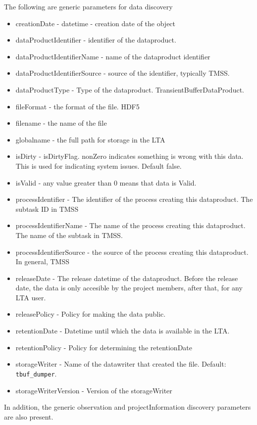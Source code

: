 \documentclass[a4paper,10pt,bibtotoc]{scrartcl}
\begin{document}
The following are generic parameters for data discovery
\begin{itemize}
    \item creationDate - datetime - creation date of the object
    \item dataProductIdentifier - identifier of the dataproduct.
    \item dataProductIdentifierName - name of the dataproduct identifier
    \item dataProductIdentifierSource - source of the identifier, typically TMSS. 
    \item dataProductType - Type of the dataproduct. TransientBufferDataProduct.
    \item fileFormat - the format of the file. HDF5
    \item filename - the name of the file
    \item globalname - the full path for storage in the LTA
    \item isDirty - isDirtyFlag. nonZero indicates something is wrong with this data. This is used for indicating system issues. Default false.
    \item isValid - any value greater than 0 means that data is Valid.
    \item processIdentifier - The identifier of the process creating this dataproduct. The subtask ID in TMSS
    \item processIdentifierName - The name of the process creating this dataproduct. The name of the subtask in TMSS.
    \item processIdentifierSource - the source of the process creating this dataproduct. In general, TMSS
    \item releaseDate - The release datetime of the dataproduct. Before the release date, the data is only accesible by the project members, after that, for any LTA user.
    \item releasePolicy - Policy for making the data public.
    \item retentionDate - Datetime until which the data is available in the LTA.
    \item retentionPolicy - Policy for determining the retentionDate
    \item storageWriter - Name of the datawriter that created the file. Default: \verb|tbuf_dumper|.
    \item storageWriterVersion - Version of the storageWriter
\end{itemize}

In addition, the generic observation and projectInformation discovery parameters are also present. 
\end{document}
